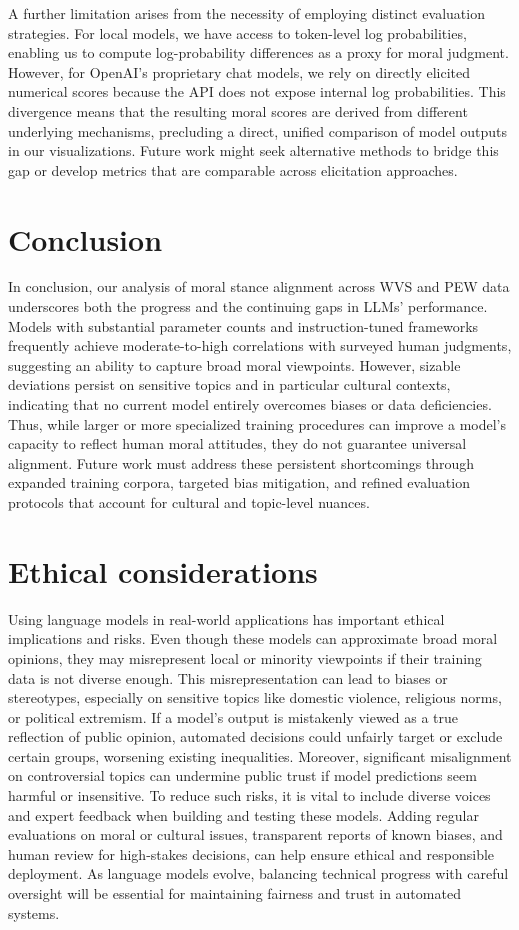 \documentclass[11pt]{article}
\begin{document}
A further limitation arises from the necessity of employing distinct evaluation strategies. For local models, we have access to token-level log probabilities, enabling us to compute log-probability differences as a proxy for moral judgment. However, for OpenAI’s proprietary chat models, we rely on directly elicited numerical scores because the API does not expose internal log probabilities. This divergence means that the resulting moral scores are derived from different underlying mechanisms, precluding a direct, unified comparison of model outputs in our visualizations. Future work might seek alternative methods to bridge this gap or develop metrics that are comparable across elicitation approaches.


\section{Conclusion}
In conclusion, our analysis of moral stance alignment across WVS and PEW data underscores both the progress and the continuing gaps in LLMs' performance. Models with substantial parameter counts and instruction-tuned frameworks frequently achieve moderate-to-high correlations with surveyed human judgments, suggesting an ability to capture broad moral viewpoints. However, sizable deviations persist on sensitive topics and in particular cultural contexts, indicating that no current model entirely overcomes biases or data deficiencies. Thus, while larger or more specialized training procedures can improve a model’s capacity to reflect human moral attitudes, they do not guarantee universal alignment. Future work must address these persistent shortcomings through expanded training corpora, targeted bias mitigation, and refined evaluation protocols that account for cultural and topic-level nuances.

\section*{Ethical considerations}
\label{sec:impact}

Using language models in real-world applications has important ethical implications and risks. Even though these models can approximate broad moral opinions, they may misrepresent local or minority viewpoints if their training data is not diverse enough. This misrepresentation can lead to biases or stereotypes, especially on sensitive topics like domestic violence, religious norms, or political extremism. If a model’s output is mistakenly viewed as a true reflection of public opinion, automated decisions could unfairly target or exclude certain groups, worsening existing inequalities. Moreover, significant misalignment on controversial topics can undermine public trust if model predictions seem harmful or insensitive. To reduce such risks, it is vital to include diverse voices and expert feedback when building and testing these models. Adding regular evaluations on moral or cultural issues, transparent reports of known biases, and human review for high-stakes decisions, can help ensure ethical and responsible deployment. As language models evolve, balancing technical progress with careful oversight will be essential for maintaining fairness and trust in automated systems.
\end{document}
